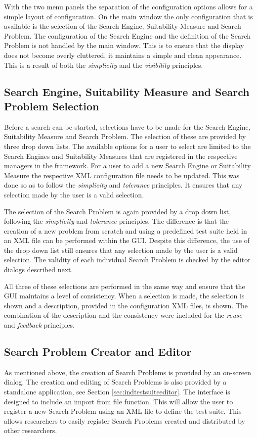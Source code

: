 With the two menu panels the separation of the configuration options allows for a simple layout of configuration.
On the main window the only configuration that is available is the selection of the Search Engine, Suitability Measure and Search Problem.
The configuration of the Search Engine and the definition of the Search Problem is not handled by the main window.
This is to ensure that the display does not become overly cluttered, it maintains a simple and clean appearance.
This is a result of both the \emph{simplicity} and the \emph{visibility} principles.

\subsection{Search Engine, Suitability Measure and Search Problem Selection}
\label{sec:seselecdes}
\label{sec:smselecdes}
\label{sec:spselecdes}
Before a search can be started, selections have to be made for the Search Engine, Suitability Measure and Search Problem.
The selection of these are provided by three drop down lists.
The available options for a user to select are limited to the Search Engines and Suitability Measures that are registered in the respective managers in the framework.
For a user to add a new Search Engine or Suitability Measure the respective XML configuration file needs to be updated.
This was done so as to follow the \emph{simplicity} and \emph{tolerance} principles.
It ensures that any selection made by the user is a valid selection.

The selection of the Search Problem is again provided by a drop down list, following the \emph{simplicity} and \emph{tolerance} principles.
The difference is that the creation of a new problem from scratch and using a predefined test suite held in an XML file can be performed within the GUI.
Despite this difference, the use of the drop down list still ensures that any selection made by the user is a valid selection.
The validity of each individual Search Problem is checked by the editor dialogs described next.

All three of these selections are performed in the same way and ensure that the GUI maintains a level of consistency.
When a selection is made, the selection is shown and a description, provided in the configuration XML files, is shown.
The combination of the description and the consistency were included for the \emph{reuse} and \emph{feedback} principles.

\subsection{Search Problem Creator and Editor}
\label{sec:guisearchcreateed}
As mentioned above, the creation of Search Problems is provided by an on-screen dialog.
The creation and editing of Search Problems is also provided by a standalone application, see Section \ref{sec:indtestsuiteeditor}.
The interface is designed to include an import from file function.
This will allow the user to register a new Search Problem using an XML file to define the test suite.
This allows researchers to easily register Search Problems created and distributed by other researchers.

